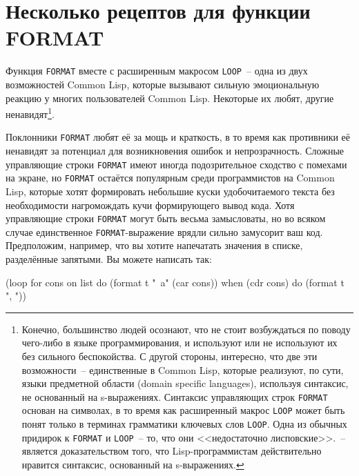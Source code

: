 \chapter{Несколько рецептов для функции FORMAT}
\label{ch:18}

\thispagestyle{empty}

Функция \lstinline{FORMAT} вместе с расширенным макросом \lstinline{LOOP}~-- одна из двух
возможностей Common Lisp, которые вызывают сильную эмоциональную реакцию у многих
пользователей Common Lisp. Некоторые их любят, другие ненавидят\footnote{Конечно,
  большинство людей осознают, что не стоит возбуждаться по поводу чего-либо в языке
  программирования, и используют или не используют их без сильного беспокойства. С другой
  стороны, интересно, что две эти возможности~-- единственные в Common Lisp, которые
  реализуют, по сути, языки предметной области (domain specific languages), используя
  синтаксис, не основанный на s-выражениях. Синтаксис управляющих строк \lstinline{FORMAT}
  основан на символах, в то время как расширенный макрос \lstinline{LOOP} может быть понят
  только в терминах грамматики ключевых слов \lstinline{LOOP}.  Одна из обычных придирок к
  \lstinline{FORMAT} и \lstinline{LOOP}~-- то, что они <<недостаточно лисповские>>.~--
  является доказательством того, что Lisp-программистам действительно нравится синтаксис,
  основанный на s-выражениях.}.

Поклонники \lstinline{FORMAT} любят её за мощь и краткость, в то время как противники её
ненавидят за потенциал для возникновения ошибок и непрозрачность. Сложные управляющие
строки \lstinline{FORMAT} имеют иногда подозрительное сходство с помехами на
экране, но \lstinline{FORMAT} остаётся популярным
среди программистов на Common Lisp, которые хотят формировать небольшие куски
удобочитаемого текста без необходимости нагромождать кучи формирующего вывод кода. Хотя
управляющие строки \lstinline{FORMAT} могут быть весьма замысловаты, но во всяком случае
единственное \lstinline{FORMAT}-выражение врядли сильно замусорит ваш код.  Предположим,
например, что вы хотите напечатать значения в списке, разделённые запятыми. Вы можете
написать так:

\begin{myverb}
(loop for cons on list
    do (format t "~a" (car cons))
    when (cdr cons) do (format t ", "))
\end{myverb}

